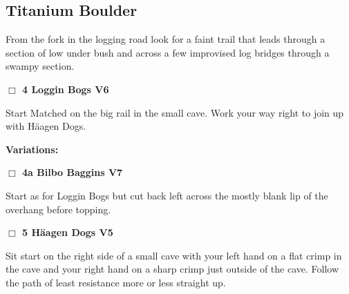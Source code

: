 	\begin{multicols}{2}

\needspace{10em}
\subsection*{Titanium Boulder}\label{bf:Titanium Boulder}

From the fork in the logging road look for a faint trail that leads through a section of low under bush and across a few improvised log bridges through a swampy section.\\



\needspace{2em}
\label{rt:Loggin Bogs}
\colorbox{RoyalBlue!20}{
\parbox{0.95\linewidth}{
\hspace{-1ex}\textbf{$\Box$
4 Loggin Bogs V6  
}}}
\begin{adjustwidth}{1.3em}{}			

Start Matched on the big rail in the small cave. Work your way right to join up with Häagen Dogs.
\end{adjustwidth}


\begin{adjustwidth}{0.5cm}{}				
\needspace{4em}
\textbf{Variations:} \newline

\needspace{2em}
\label{vr:Bilbo Baggins}
\colorbox{Goldenrod!20}{
\parbox{0.95\linewidth}{
\hspace{-1ex}\textbf{$\Box$
4a Bilbo Baggins V7  
}}}
\begin{adjustwidth}{1.3em}{}			

Start as for Loggin Bogs but cut back left across the mostly blank lip of the overhang before topping.
\end{adjustwidth}



\end{adjustwidth}


\needspace{2em}
\label{rt:Häagen Dogs}
\colorbox{RoyalBlue!20}{
\parbox{0.95\linewidth}{
\hspace{-1ex}\textbf{$\Box$
5 Häagen Dogs V5  
}}}
\begin{adjustwidth}{1.3em}{}			

Sit start on the right side of a small cave with your left hand on a flat crimp in the cave and your right hand on a sharp crimp just outside of the cave. Follow the path of least resistance more or less straight up.
\end{adjustwidth}




\end{multicols}
